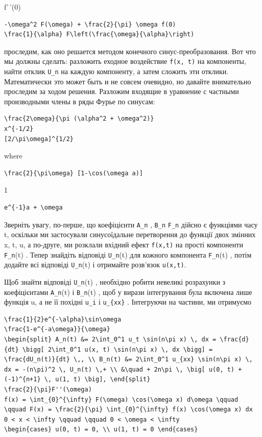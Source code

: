 \documentclass[
  ukrainian,
]{article}
\begin{document}
f'\,'(0)

\begin{verbatim}
-\omega^2 F(\omega) + \frac{2}{\pi} \omega f(0)
\frac{1}{\alpha} F\left(\frac{\omega}{\alpha}\right)
\end{verbatim}

проследим, как оно решается методом конечного синус-преобразования. Вот
что мы должны сделать: разложить еходное воздействие \texttt{f(x,\ t)}
на компоненты, найти отклик \texttt{U\_n} на каждую компоненту, а затем
сложить эти отклики. Математически это может быть и не совсем очевидно,
но давайте внимательно проследим за ходом решения. Разложим входящие в
уравнение с частными производными члены в ряды Фурье по синусам:

\begin{verbatim}
\frac{2\omega}{\pi (\alpha^2 + \omega^2)}
x^{-1/2}
[2/\pi\omega]^{1/2}
\end{verbatim}

where

\begin{verbatim}
\frac{2}{\pi\omega} [1-\cos(\omega a)]
\end{verbatim}

1

\begin{verbatim}
e^{-1}a + \omega
\end{verbatim}

Зверніть увагу, по-перше, що коефіцієнти \texttt{A\_n} , \texttt{B\_n}
\texttt{F\_n} дійсно є функціями часу t, оскільки ми застосували
синусоїдальне перетворення до функції двох змінних x, t, u, а по-друге,
ми розклали вхідний ефект \texttt{f(x,t)} на прості компоненти
\texttt{F\_n}(t) . Тепер знайдіть відповіді \texttt{U\_n}(t) для кожного
компонента \texttt{F\_n}(t) , потім додайте всі відповіді
\texttt{U\_n}(t) і отримайте розв'язок \texttt{u(x,t)}.

Щоб знайти відповіді \texttt{U\_n}(t) , необхідно робити невеликі
розрахунки з коефіцієнтами \texttt{A\_n}(t) і \texttt{B\_n}(t) , щоб у
вирази інтегрування була включена лише функція u, а не її похідні
\texttt{u\_i} і \texttt{u\_\{xx\}} . Інтегруючи на частини, ми отримуємо

\begin{verbatim}
\frac{1}{2}e^{-\alpha}\sin\omega
\frac{1-e^{-a\omega}}{\omega}
\begin{split} A_n(t) &= 2\int_0^1 u_t \sin(n\pi x) \, dx = \frac{d}{dt} \bigg[ 2\int_0^1 u(x, t) \sin(n\pi x) \, dx \bigg] = \frac{dU_n(t)}{dt} \,, \\ B_n(t) &= 2\int_0^1 u_{xx} \sin(n\pi x) \, dx = -(n\pi)^2 \, U_n(t) \,+ \\ &\quad + 2n\pi \, \big[ u(0, t) + (-1)^{n+1} \, u(1, t) \big], \end{split}
\frac{2}{\pi}F''(\omega)
f(x) = \int_{0}^{\infty} F(\omega) \cos(\omega x) d\omega \qquad \qquad F(x) = \frac{2}{\pi} \int_{0}^{\infty} f(x) \cos(\omega x) dx
0 < x < \infty \qquad \qquad 0 < \omega < \infty
\begin{cases} u(0, t) = 0, \\ u(1, t) = 0 \end{cases}
\end{verbatim}
\end{document}
